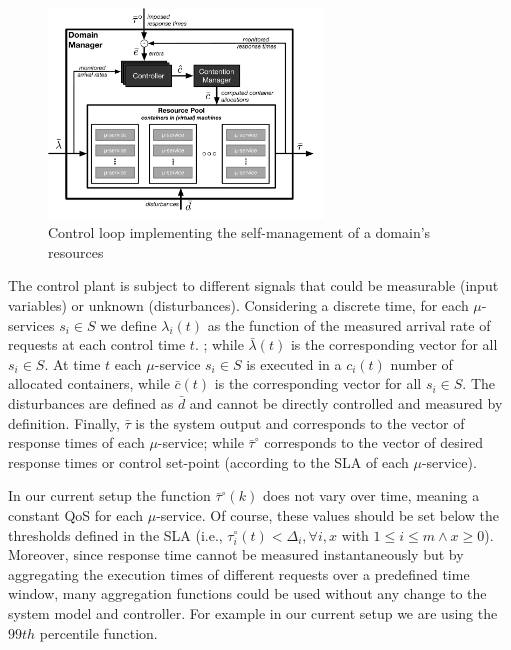 \begin{figure}[tbp]
	\includegraphics[width=0.65\textwidth]{figs/domain-manager-allocation}
	\caption{Control loop implementing the self-management of a domain's resources}
	\label{fig:A3Edomain-manager}
\end{figure}



The control plant is subject to different signals that could be measurable (input variables) or unknown (disturbances). Considering a discrete time, for each $\mu$-services $s_i \in S$ we define $\lambda_i(t)$ as the function of the measured arrival rate of requests at each control time $t$.
; while $\bar{\lambda}(t)$ is the corresponding vector for all $s_i \in S$. 
At time $t$ each $\mu$-service $s_i \in S$ is executed in a $c_i(t)$ number of allocated containers, while $\bar{c}(t)$ is the corresponding vector for all $s_i \in S$. The disturbances are defined as $\bar{d}$ and cannot be directly controlled and measured by definition. Finally, $\bar{\tau}$ is the system output and corresponds to the vector of response times of each $\mu$-service; while $\bar{\tau}^\circ$ corresponds to the vector of desired response times or control set-point (according to the SLA of each $\mu$-service). 

In our current setup the function $\bar{\tau}^\circ(k)$ does not vary over time, meaning a constant QoS for each  $\mu$-service. Of course, these values should be set below the thresholds defined in the SLA (i.e., ${\tau}^\circ_i(t) < \Delta_i, \forall i, x$ with $ 1 \le i \le m \wedge x \ge 0$). Moreover, since response time cannot be measured instantaneously but by aggregating the execution times of different requests over a predefined time window, many aggregation functions could be used without any change to the system model and controller. For example in our current setup we are using the $99th$ percentile function. 

